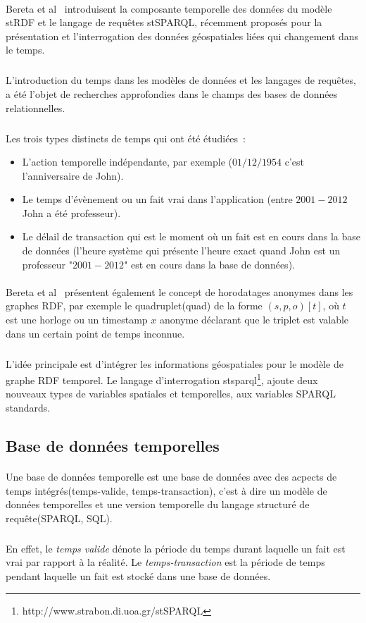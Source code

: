 \documentclass[12pt,a4	]{report}
\begin{document}
\paragraph{}
Bereta et al~\cite{bereta2013} introduisent la composante temporelle des données du modèle stRDF et le langage de requêtes stSPARQL, récemment proposés pour la présentation et l’interrogation des données géospatiales liées qui changement dans le temps.
\subparagraph{}
L’introduction du temps dans les modèles de données et les langages de requêtes, a été l’objet de recherches approfondies dans le champs des bases de données relationnelles.
\subparagraph{}
Les trois types distincts de temps qui ont été  étudiées~:
\begin{itemize}
\item L'action temporelle indépendante, par exemple ($01/12/1954$ c’est l’anniversaire de John).
\item Le temps d’évènement ou un fait vrai dans l’application (entre $2001-2012$ John a été professeur).
\item Le délail de transaction qui est le moment où un fait est en cours dans la base de données (l’heure système qui présente l’heure exact quand John est un professeur "$2001-2012$" est en cours dans la base de données).
\end{itemize}
\paragraph{}
Bereta et al~\cite{bereta2013} présentent également le concept de horodatages anonymes dans les graphes RDF, par exemple le quadruplet(quad) de la forme $(s, p, o)[t]$, où $t$ est une horloge ou un timestamp $x$ anonyme déclarant que le triplet est valable dans un certain point de temps inconnue.
\subparagraph{}
L’idée principale est d’intégrer les informations géospatiales pour le modèle de graphe RDF temporel. Le langage d’interrogation \gls{stsparql}\footnote{http://www.strabon.di.uoa.gr/stSPARQL}, ajoute deux nouveaux types de variables spatiales et temporelles, aux variables SPARQL standards.
\subsection*{Base de données temporelles}
\paragraph{}
Une base de données temporelle est une base de données avec des acpects de temps intégrés(temps-valide, temps-transaction), c'est à dire un modèle de données temporelles et une version temporelle du langage structuré de requête(SPARQL, SQL).
\subparagraph{}
En effet, le \textit{temps valide} dénote la période du temps durant laquelle un fait est vrai par rapport à la réalité.
Le \textit{temps-transaction} est la période de temps pendant laquelle un fait est stocké dans une base de données.
\end{document}
